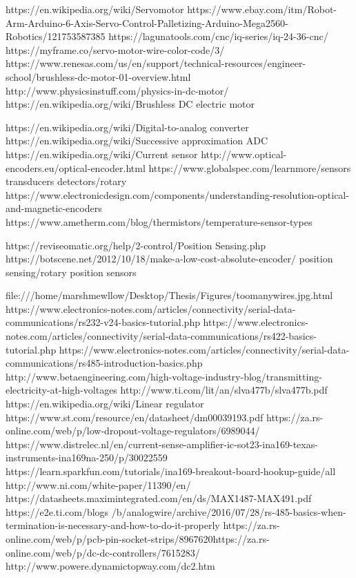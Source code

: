 \begin{thebibliography}{5}
https://en.wikipedia.org/wiki/Servomotor
https://www.ebay.com/itm/Robot-Arm-Arduino-6-Axis-Servo-Control-Palletizing-Arduino-Mega2560-Robotics/121753587385
https://lagunatools.com/cnc/iq-series/iq-24-36-cnc/
https://myframe.co/servo-motor-wire-color-code/3/
https://www.renesas.com/us/en/support/technical-resources/engineer-school/brushless-dc-motor-01-overview.html
http://www.physicsinstuff.com/physics-in-dc-motor/
https://en.wikipedia.org/wiki/Brushless DC electric motor


https://en.wikipedia.org/wiki/Digital-to-analog converter
https://en.wikipedia.org/wiki/Successive approximation ADC
https://en.wikipedia.org/wiki/Current sensor
http://www.optical-encoders.eu/optical-encoder.html
https://www.globalspec.com/learnmore/sensors transducers detectors/rotary
https://www.electronicdesign.com/components/understanding-resolution-optical-and-magnetic-encoders
https://www.ametherm.com/blog/thermistors/temperature-sensor-types

https://reviseomatic.org/help/2-control/Position Sensing.php
https://botscene.net/2012/10/18/make-a-low-cost-absolute-encoder/
 position sensing/rotary position sensors


file:///home/marshmewllow/Desktop/Thesis/Figures/toomanywires.jpg.html
https://www.electronics-notes.com/articles/connectivity/serial-data-communications/rs232-v24-basics-tutorial.php
https://www.electronics-notes.com/articles/connectivity/serial-data-communications/rs422-basics-tutorial.php
https://www.electronics-notes.com/articles/connectivity/serial-data-communications/rs485-introduction-basics.php
http://www.betaengineering.com/high-voltage-industry-blog/transmitting-electricity-at-high-voltages
http://www.ti.com/lit/an/slva477b/slva477b.pdf
https://en.wikipedia.org/wiki/Linear regulator
https://www.st.com/resource/en/datasheet/dm00039193.pdf
https://za.rs-online.com/web/p/low-dropout-voltage-regulators/6989044/
https://www.distrelec.nl/en/current-sense-amplifier-ic-sot23-ina169-texas-instruments-ina169na-250/p/30022559
https://learn.sparkfun.com/tutorials/ina169-breakout-board-hookup-guide/all
 http://www.ni.com/white-paper/11390/en/
https://datasheets.maximintegrated.com/en/ds/MAX1487-MAX491.pdf
https://e2e.ti.com/blogs /b/analogwire/archive/2016/07/28/rs-485-basics-when-termination-is-necessary-and-how-to-do-it-properly
https://za.rs-online.com/web/p/pcb-pin-socket-strips/8967620https://za.rs-online.com/web/p/dc-dc-controllers/7615283/
http://www.powere.dynamictopway.com/dc2.htm


\end{thebibliography}
